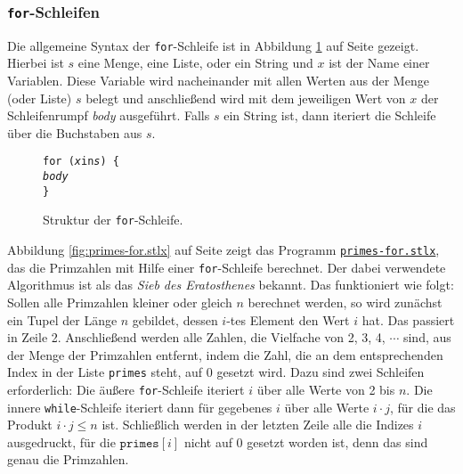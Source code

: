\subsubsection{\texttt{for}-Schleifen}
Die allgemeine Syntax der \texttt{for}-Schleife ist in Abbildung \ref{fig:for} auf Seite
\pageref{fig:for} gezeigt.  Hierbei ist $s$ eine Menge, eine Liste, oder ein String und $x$ ist  der
Name einer 
Variablen. Diese Variable wird nacheinander mit allen Werten aus der Menge (oder Liste) $s$
belegt und anschließend wird mit dem jeweiligen Wert von $x$ der
Schleifenrumpf \textsl{body} ausgeführt.  Falls $s$ ein String ist, dann iteriert die Schleife über
die Buchstaben aus $s$.

\begin{figure}[!ht]
  \centering
\begin{alltt}
      \texttt{for (}\textsl{x} \texttt{in} \textsl{s}\texttt{) \{}
          \textsl{body}
      \texttt{\}}
\end{alltt}
\vspace*{-0.3cm}
\caption{Struktur der \texttt{for}-Schleife.}  \label{fig:for}
\end{figure} 

Abbildung \ref{fig:primes-for.stlx} auf Seite
\pageref{fig:primes-for.stlx} zeigt das Programm
\href{https://github.com/karlstroetmann/Logik/blob/master/SetlX/primes-for.stlx}{\texttt{primes-for.stlx}},
das die Primzahlen mit Hilfe einer \texttt{for}-Schleife berechnet.
Der dabei verwendete Algorithmus ist als das \emph{Sieb des Eratosthenes}
bekannt.  Das funktioniert wie folgt: Sollen alle Primzahlen kleiner oder gleich
$n$ berechnet werden, so wird zunächst ein Tupel der Länge $n$ gebildet, dessen
$i$-tes Element den Wert $i$ hat.  Das passiert in Zeile 2.  Anschließend werden 
 alle Zahlen, die Vielfache von 2, 3, 4, $\cdots$ sind, aus der Menge der
Primzahlen entfernt, indem die Zahl, die an dem entsprechenden Index in der Liste
\texttt{primes} steht, auf 0 gesetzt wird.
Dazu sind zwei Schleifen erforderlich: Die äußere \texttt{for}-Schleife iteriert
$i$ über alle Werte von 2 bis $n$.  Die innere \texttt{while}-Schleife iteriert dann für
gegebenes $i$ über alle Werte $i \cdot j$, für die das Produkt $i \cdot j \leq n$ ist.
Schließlich werden in der letzten  Zeile alle die
Indizes $i$ ausgedruckt, für die $\mathtt{primes}[i]$  nicht auf 0 gesetzt worden ist,
denn das sind genau die Primzahlen.

